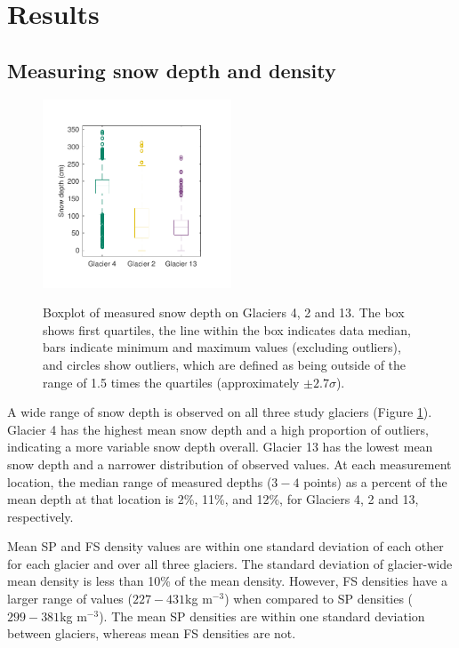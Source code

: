 \documentclass[twocolumn,letterpaper]{igs}
\begin{document}
\section{Results}

\subsection{Measuring snow depth and density}

\begin{figure}
	\centering
	\includegraphics[width =0.5\textwidth]{DepthBoxplot.pdf}\\
	\caption{Boxplot of measured snow depth on Glaciers 4, 2 and 13. The box shows first quartiles, the line within the box indicates data median, bars indicate minimum and maximum values (excluding outliers), and circles show outliers, which are defined as being outside of the range of 1.5 times the quartiles (approximately $\pm2.7\sigma$). }
	\label{fig:DepthBoxplot}
\end{figure}

A wide range of snow depth is observed on all three study glaciers (Figure \ref{fig:DepthBoxplot}). Glacier 4 has the highest mean snow depth and a high proportion of outliers, indicating a more variable snow depth overall. Glacier 13 has the lowest mean snow depth and a narrower distribution of observed values. At each measurement location, the median range of measured depths ($3-4$ points) as a percent of the mean depth at that location is 2\%, 11\%, and 12\%, for Glaciers 4, 2 and 13, respectively. 

Mean SP and FS density values are within one standard deviation of each other for each glacier and over all three glaciers. The standard deviation of glacier-wide mean density is less than 10\% of the mean density. However, FS densities have a larger range of values ($227-431$kg m$^{-3}$) when compared to SP densities ($299-381$kg m$^{-3}$).  The mean SP densities are within one standard deviation between glaciers, whereas mean FS densities are not.
\end{document}
